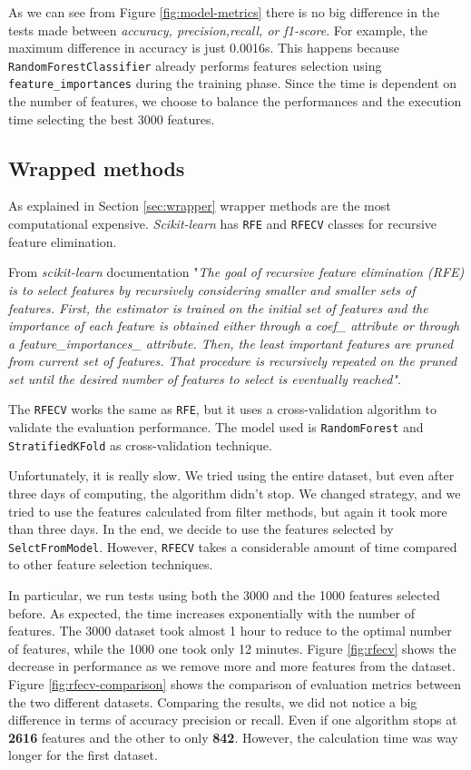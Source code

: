 As we can see from Figure \ref{fig:model-metrics} there is no big difference in the tests made between \textit{accuracy, precision,recall, or f1-score}. For example, the maximum difference in accuracy is just 0.0016s. This happens because \texttt{RandomForestClassifier} already performs features selection using \texttt{feature\_importances} during the training phase. Since the time is dependent on the number of features, we choose to balance the performances and the execution time selecting the best 3000 features.

\subsection{Wrapped methods}

As explained in Section \ref{sec:wrapper} wrapper methods are the most computational expensive. \textit{Scikit-learn} has \texttt{RFE} and \texttt{RFECV} classes for recursive feature elimination. 

From \textit{scikit-learn} documentation \cite{rfe} "\textit{The goal of recursive feature elimination (RFE) is to select features by recursively considering smaller and smaller sets of features. First, the estimator is trained on the initial set of features and the importance of each feature is obtained either through a coef\_ attribute or through a feature\_importances\_ attribute. Then, the least important features are pruned from current set of features. That procedure is recursively repeated on the pruned set until the desired number of features to select is eventually reached"}.

The \texttt{RFECV} works the same as \texttt{RFE}, but it uses a cross-validation algorithm to validate the evaluation performance.
The model used is \texttt{RandomForest} and \texttt{StratifiedKFold} as cross-validation technique.

Unfortunately, it is really slow. We tried using the entire dataset, but even after three days of computing, the algorithm didn't stop. We changed strategy, and we tried to use the features calculated from filter methods, but again it took more than three days. In the end, we decide to use the features selected by \texttt{SelctFromModel}. However, \texttt{RFECV} takes a considerable amount of time compared to other feature selection techniques.

In particular, we run tests using both the 3000 and the 1000 features selected before. As expected, the time increases exponentially with the number of features. The 3000 dataset took almost 1 hour to reduce to the optimal number of features, while the 1000 one took only 12 minutes.  Figure \ref{fig:rfecv} shows the decrease in performance as we remove more and more features from the dataset. Figure \ref{fig:rfecv-comparison} shows the comparison of evaluation metrics between the two different datasets.
Comparing the results, we did not notice a big difference in terms of accuracy precision or recall. Even if one algorithm stops at \textbf{2616} features and the other to only \textbf{842}. However, the calculation time was way longer for the first dataset. 

